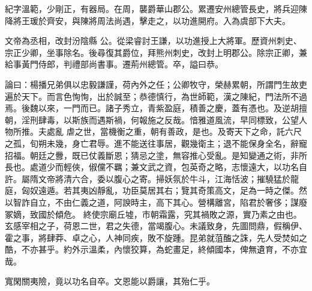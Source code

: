 \begin{pinyinscope}
 紀字溫範，少剛正，有器局。在周，襲爵華山郡公。累遷安州總管長史，將兵迎陳降將王瑗於齊安，與陳將周法尚遇，擊走之，以功進開府。入為虞部下大夫。



 文帝為丞相，改封汾陰縣
 公。從梁睿討王謙，以功進授上大將軍。歷資州刺史、宗正少卿，坐事除名。後尋復其爵位，拜熊州刺史，改封上明郡公。除宗正卿，兼給事黃門侍郎，判禮部尚書事。遷荊州總管。卒，謚曰恭。



 論曰：楊播兄弟俱以忠毅謙謹，荷內外之任；公卿牧守，榮赫累朝，所謂門生故吏遍於天下。而言色恂恂，出於誠至；恭德慎行，為世師範，漢之陳紀，門法所不過焉。後魏以來，一門而已。諸子秀立，青紫盈庭，積善之慶，蓋有憑也。及逆胡擅朝，淫刑肆毒，以斯族而遇斯禍，何報施之反哉。愔雅道風流，早同標致，公望人物所推。夫處亂
 虐之世，當機衡之重，朝有善政，是也。及寄天下之命，託六尺之孤，旬朔未幾，身亡君辱。進不能送往事居，觀幾衛主；退不能保身全名，辭寵招福。朝廷之釁，既已仗義斷恩；猜忌之塗，無容推心受亂。是知變通之術，非所長也。處道少而輕俠，俶儻不羈；兼文武之資，包英奇之略，志懷遠大，以功名自許。屬隋文帝將清六合，委以腹心之寄。掃妖氛於牛斗，江海恬波；摧驍猛於龍庭，匈奴遠遁。若其夷凶靜亂，功臣莫居其右；覽其奇策高文，足為一時之傑。然以智詐自立，不由仁義之道，阿諛時主，高下其心。營構離宮，陷君於奢侈；謀廢冢嫡，致國於傾危。
 終使宗廟丘墟，市朝霜露，究其禍敗之源，實乃素之由也。玄感宰相之子，荷恩二世，君之失德，當竭腹心。未議致身，先圖問鼎，假稱伊、霍之事，將肆莽、卓之心，人神同疾，敗不旋踵。昆弟就菹醢之誅，先人受焚如之酷，不亦甚乎。約外示溫柔，內懷狡算，為蛇畫足，終傾國本，俾無遺育，不亦宜哉。



 寬閑關夷險，竟以功名自卒。文恩能以爵讓，其殆仁乎。



\end{pinyinscope}